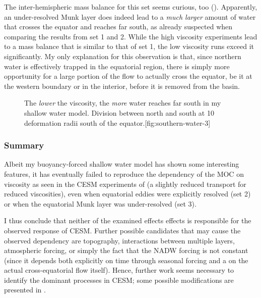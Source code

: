 \parabreak

The inter-hemispheric mass balance for this set seems curious, too (). Apparently, an under-resolved Munk layer does indeed lead to a \emph{much larger} amount of water that crosses the equator and reaches far south, as already suspected when comparing the results from set 1 and 2. While the high viscosity experiments lead to a mass balance that is similar to that of set 1, the low viscosity runs exceed it significantly. My only explanation for this observation is that, since northern water is effectively trapped in the equatorial region, there is simply more opportunity for a large portion of the flow to actually cross the equator, be it at the western boundary or in the interior, before it is removed from the basin.

\begin{figure}
	\begin{sidecaption}{The \emph{lower} the viscosity, the \emph{more} water reaches far south in my shallow water model. Division between north and south at \num{10} deformation radii south of the equator.}[fig:southern-water-3]
		\antimpjustification
	\end{sidecaption}
\end{figure}

\subsubsection{Summary}
Albeit my buoyancy-forced shallow water model has shown some interesting features, it has eventually failed to reproduce the dependency of the \ac{MOC} on viscosity as seen in the \ac{CESM} experiments of  (\ie a slightly reduced transport for reduced viscosities), even when equatorial eddies were explicitly resolved (set 2) or when the equatorial Munk layer was under-resolved (set 3).

I thus conclude that neither of the examined effects effects%
%
%
is responsible for the observed response of \ac{CESM}. Further possible candidates that may cause the observed dependency are \eg topography, interactions between multiple layers, atmospheric forcing, or simply the fact that the \ac{NADW} forcing is not constant (since it depends both explicitly on time through \eg seasonal forcing and a on the actual cross-equatorial flow itself). Hence, further work seems necessary to identify the dominant processes in \ac{CESM}; some possible modifications are presented in .